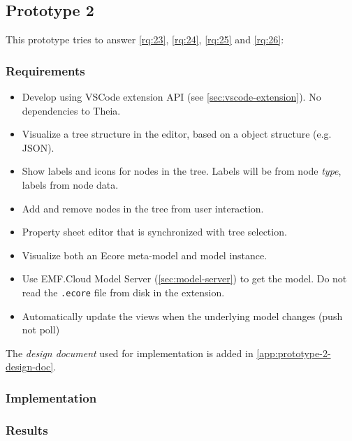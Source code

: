 \subsection{Prototype 2}

This prototype tries to answer \cref{rq:23}, \cref{rq:24}, \cref{rq:25} and \cref{rq:26}:
\begin{displayquote}
  
  
  
  
\end{displayquote}

\subsubsection{Requirements}

\begin{itemize}
  \item Develop using VSCode extension \acrshort{API} (see \cref{sec:vscode-extension}). No dependencies to Theia.
  \item Visualize a tree structure in the editor, based on a object structure (e.g. \gls{JSON}).
  \item Show labels and icons for nodes in the tree. Labels will be from node \emph{type}, labels from node data.
  \item Add and remove nodes in the tree from user interaction.
  \item Property sheet editor that is synchronized with tree selection.
  \item Visualize both an Ecore meta-model and model instance.
  \item Use EMF.Cloud Model Server (\cref{sec:model-server}) to get the model. Do not read the \texttt{.ecore} file from disk in the extension.
  \item Automatically update the views when the underlying model changes (push not poll)
\end{itemize}

The \textit{design document} used for implementation is added in \cref{app:prototype-2-design-doc}.

\subsubsection{Implementation}

\subsubsection{Results}

